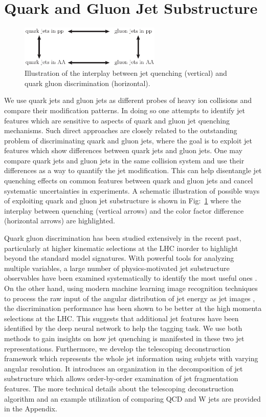 \documentclass[notoc]{JHEP3}
\begin{document}
\section{Quark and Gluon Jet Substructure}
\label{sec:qg}
\begin{figure}[h]
	   \centering
	   \includegraphics[width=0.6\textwidth]{plots/qg_HI}
	   \caption{Illustration of the interplay between jet quenching (vertical) and quark gluon discrimination (horizontal). }
	   \label{fig:quenching_discrimination}
\end{figure}

We use quark jets and gluon jets as different probes of heavy ion collisions and compare their modification patterns. In doing so one attempts to identify jet features which are sensitive to aspects of quark and gluon jet quenching mechanisms. Such direct approaches are closely related to the outstanding problem of discriminating quark and gluon jets, where the goal is to exploit jet features which show differences between quark jets and gluon jets. One may compare quark jets and gluon jets in the same collision system and use their differences as a way to quantify the jet modification. This can help disentangle jet quenching effects on common features between quark and gluon jets and cancel systematic uncertainties in experiments. A schematic illustration of possible ways of exploiting quark and gluon jet substructure is shown in Fig:~\ref{fig:quenching_discrimination} where the interplay between quenching (vertical arrows) and the color factor difference (horizontal arrows) are highlighted. 

Quark gluon discrimination has been studied extensively in the recent past, particularly at higher kinematic selections at the LHC inorder to highlight beyond the standard model signatures\cite{}. With powerful tools for analyzing multiple variables, a large number of physics-motivated jet substructure observables have been examined systematically to identify the most useful ones \cite{Gallicchio:2011xq,Gallicchio:2012ez}. On the other hand, using modern machine learning image recognition techniques to process the raw input of the angular distribution of jet energy as jet images \cite{Komiske:2016rsd}, the discrimination performance has been shown to be better at the high momenta selections at the LHC. This suggests that additional jet features have been identified by the deep neural network to help the tagging task. We use both methods to gain insights on how jet quenching is manifested in these two jet representations. Furthermore, we develop the telescoping deconstruction framework which represents the whole jet information using subjets with varying angular resolution. It introduces an organization in the decomposition of jet substructure which allows order-by-order examination of jet fragmentation features. The more technical details about the telescoping deconstruction algorithm and an example utilization of comparing QCD and W jets are provided in the Appendix.
\end{document}
